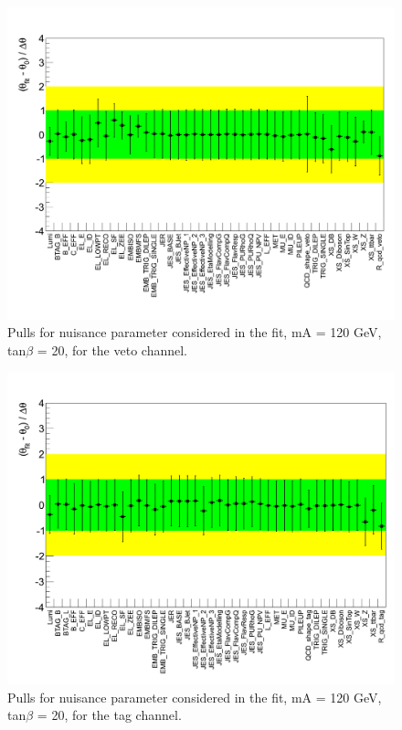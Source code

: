 \begin{figure}[htp]
     \begin{center}

            \includegraphics[width=\textwidth]{figure/np_check/pull_veto.png}
    \end{center}
    \caption{ Pulls for nuisance parameter considered in the fit,  mA = 120 GeV, tan$\beta$ = 20, for the veto channel.} 
    \label{fig:np_pull_veto}
\end{figure}


\begin{figure}[htp]
     \begin{center}

            \includegraphics[width=\textwidth]{figure/np_check/pull_tag.png}
    \end{center}
    \caption{ Pulls for nuisance parameter considered in the fit,  mA = 120 GeV, tan$\beta$ = 20, for the tag  channel.} 
    \label{fig:np_pull_tag}
\end{figure}


